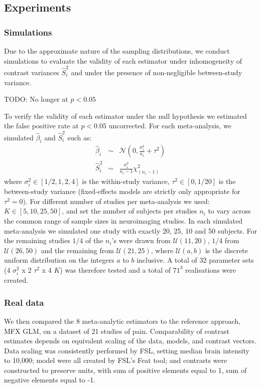 \documentclass[preprint,12pt]{elsarticle}
\newcommand{\effectvector}{\hat\beta}
\newcommand{\effect}[1][i]{\effectvector_{#1}}
\newcommand{\vareffect}[1][i]{\hat S^2_{#1}}
\newcommand{\nStudies}{K}
\newcommand{\varBetween}{\tau^2}
\newcommand{\sampleSize}[1][i]{n_{#1}}
\newcommand{\varWithin}[1][i]{\sigma^2_{#1}}
\begin{document}
\subsection{Experiments}

\subsubsection{Simulations}
Due to the approximate nature of the sampling distributions, we conduct simulations to evaluate the validity of each estimator under inhomogeneity of contrast variances $\vareffect$ and under the presence of non-negligible between-study variance.


TODO: No longer at $p<0.05$

To verify the validity of each estimator under the null hypothesis we estimated the false positive rate at $p<0.05$ uncorrected. For each meta-analysis, we simulated $\effect$ and $\vareffect$ such as:
\begin{eqnarray}
	\effect &\sim& \mathcal{N}(0, \frac{\varWithin}{\sampleSize}+\varBetween) \\
	\vareffect &\sim& \frac{\varWithin}{\sampleSize-1} \chi^2_{(\sampleSize-1)}%
\end{eqnarray}
where $\varWithin \in [1/2, 1, 2, 4]$ is the within-study variance, $\varBetween \in [0, 1/20]$ is the between-study variance (fixed-effects models are strictly only appropriate for $\varBetween=0$). For different number of studies per meta-analysis we used: $\nStudies \in [5, 10, 25, 50]$, and set the number of subjects per studies $\sampleSize$ to vary across the common range of sample sizes in neuroimaging studies. In each simulated meta-analysis we simulated one study with exactly 20, 25, 10 and 50 subjects. For the remaining studies $1/4$ of the $\sampleSize$'s were drawn from $\mathcal{U}(11,20)$, $1/4$ from $\mathcal{U}(26,50)$ and the remaining from $\mathcal{U}(21,25)$, where $\mathcal{U}(a,b)$ is the discrete uniform distribution on the integers $a$ to $b$ inclusive. A total of 32 parameter sets (4 $\varWithin$ x 2 $\varBetween$ x 4 $\nStudies$) was therefore tested and a total of $71^3$ realisations were created.


\subsubsection{Real data}
We then compared the 8 meta-analytic estimators to the reference approach, MFX GLM, on a dataset of 21 studies of pain. 
Comparability of contrast estimates depends on equivalent scaling of the data, models, and contrast vectors. Data scaling was consistently performed by FSL, setting median brain intensity to 10,000; model were all created by FSL's Feat tool; and contrasts were constructed to preserve units, with sum of positive elements equal to 1, sum of negative elements equal to -1. 
\end{document}
